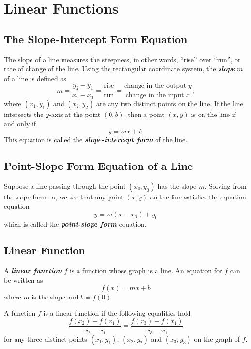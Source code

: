 \documentclass[en,12pt]{elegantbook}
\begin{document}
\hypertarget{linear-functions}{%
\chapter{Linear Functions}\label{linear-functions}}

\hypertarget{the-slope-intercept-form-equation}{%
\section{The Slope-Intercept Form Equation}\label{the-slope-intercept-form-equation}}

The slope of a line measures the steepness, in other words, ``rise'' over ``run'', or rate of change of the line. Using the rectangular coordinate system, the \textbf{\emph{slope}} \(m\) of a line is defined as
\[
m=\dfrac{y_2-y_1}{x_2-x_1}=\dfrac{\text{rise}}{\text{run}}=\dfrac{\text{change in the output }y}{\text{change in the input } x},
\]
where \((x_1, y_1)\) and \((x_2, y_2)\) are any two distinct points on the line. If the line intersects the \(y\)-axis at the point \((0, b)\), then a point \((x, y)\) is on the line if and only if
\[
y=mx+b.
\]
This equation is called the \textbf{\emph{slope-intercept form}} of the line.

\hypertarget{point-slope-form-equation-of-a-line}{%
\section{Point-Slope Form Equation of a Line}\label{point-slope-form-equation-of-a-line}}

Suppose a line passing through the point \((x_0, y_0)\) has the slope \(m\). Solving from the slope formula, we see that any point \((x, y)\) on the line satisfies the equation equation
\[
y=m(x-x_0)+y_0
\]
which is called the \textbf{\emph{point-slope form}} equation.

\hypertarget{linear-function}{%
\section{Linear Function}\label{linear-function}}

A \textbf{\emph{linear function}} \(f\) is a function whose graph is a line. An equation for \(f\) can be written as
\[f(x) = mx + b\]
where \(m\) is the slope and \(b=f(0)\).

A function \(f\) is a linear function if the following equalities hold
\[
\dfrac{f(x_2)-f(x_1)}{x_2-x_1}
=\dfrac{f(x_3)-f(x_1)}{x_3-x_1}
\]
for any three distinct points \((x_1, y_1)\), \((x_2, y_2)\) and \((x_3, y_3)\) on the graph of \(f\).
\end{document}
